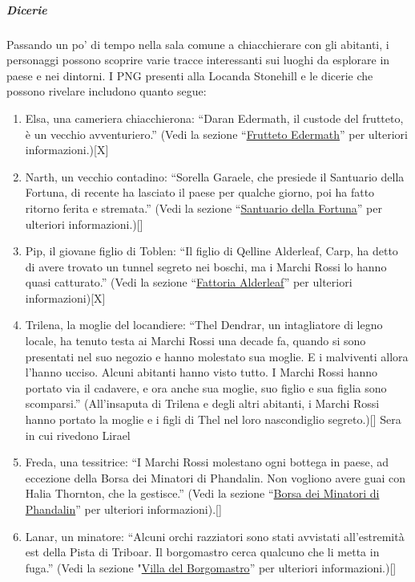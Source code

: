 \documentclass{article}
\begin{document}
\subparagraph{Dicerie}
Passando un po’ di tempo nella sala comune a
chiacchierare con gli abitanti, i personaggi possono scoprire
varie tracce interessanti sui luoghi da esplorare in paese e nei
dintorni. I PNG presenti alla Locanda Stonehill e le dicerie
che possono rivelare includono quanto segue:
\begin{enumerate}
    \item Elsa, una cameriera chiacchierona: “Daran Edermath, il
custode del frutteto, è un vecchio avventuriero.” (Vedi la
sezione “\hyperlink{frutteto}{Frutteto Edermath}” per ulteriori informazioni.)[X]
    \item Narth, un vecchio contadino: “Sorella Garaele, che presiede
il Santuario della Fortuna, di recente ha lasciato il paese
per qualche giorno, poi ha fatto ritorno ferita e stremata.”
(Vedi la sezione “\hyperlink{santuario}{Santuario della Fortuna}” per ulteriori
informazioni.)[]
\item Pip, il giovane figlio di Toblen: “Il figlio di Qelline Alderleaf,
Carp, ha detto di avere trovato un tunnel segreto nei boschi,
ma i Marchi Rossi lo hanno quasi catturato.” (Vedi la
sezione “\hyperlink{fattoria}{Fattoria Alderleaf}” per ulteriori informazioni)[X]
\item Trilena, la moglie del locandiere: “Thel Dendrar, un
intagliatore di legno locale, ha tenuto testa ai Marchi Rossi
una decade fa, quando si sono presentati nel suo negozio e
hanno molestato sua moglie. E i malviventi allora l'hanno
ucciso. Alcuni abitanti hanno visto tutto. I Marchi Rossi
hanno portato via il cadavere, e ora anche sua moglie, suo
figlio e sua figlia sono scomparsi.” (All’insaputa di Trilena e
degli altri abitanti, i Marchi Rossi hanno portato la moglie e
i figli di Thel nel loro nascondiglio segreto.)[] Sera in cui rivedono Lirael
\item Freda, una tessitrice: “I Marchi Rossi molestano ogni
bottega in paese, ad eccezione della Borsa dei Minatori di
Phandalin. Non vogliono avere guai con Halia Thornton,
che la gestisce.” (Vedi la sezione “\hyperlink{borsa}{Borsa dei Minatori di
Phandalin}” per ulteriori informazioni).[] 
    \item Lanar, un minatore: “Alcuni orchi razziatori sono stati
avvistati all'estremità est della Pista di Triboar. Il
borgomastro cerca qualcuno che li metta in fuga.” (Vedi la
sezione "\hyperlink{villa}{Villa del Borgomastro}” per ulteriori informazioni.)[]
    


\end{enumerate}
\end{document}
